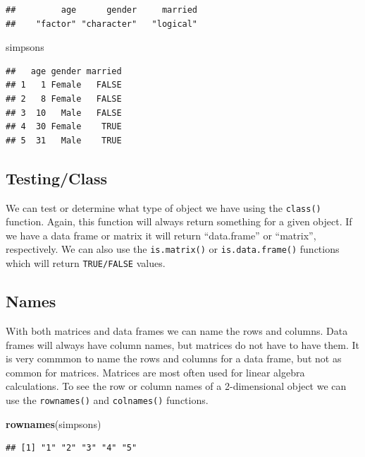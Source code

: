 \documentclass[
]{book}
\newenvironment{Shaded}{\begin{snugshade}}{\end{snugshade}}
\newcommand{\KeywordTok}[1]{\textcolor[rgb]{0.13,0.29,0.53}{\textbf{#1}}}
\newcommand{\NormalTok}[1]{#1}
\begin{document}
\begin{verbatim}
##         age      gender     married 
##    "factor" "character"   "logical"
\end{verbatim}

\begin{Shaded}
\begin{Highlighting}[]
\NormalTok{simpsons}
\end{Highlighting}
\end{Shaded}

\begin{verbatim}
##   age gender married
## 1   1 Female   FALSE
## 2   8 Female   FALSE
## 3  10   Male   FALSE
## 4  30 Female    TRUE
## 5  31   Male    TRUE
\end{verbatim}

\hypertarget{testingclass-2}{%
\subsection{Testing/Class}\label{testingclass-2}}

We can test or determine what type of object we have using the \texttt{class()} function. Again, this function will always return something for a given object. If we have a data frame or matrix it will return ``data.frame'' or ``matrix'', respectively. We can also use the \texttt{is.matrix()} or \texttt{is.data.frame()} functions which will return \texttt{TRUE/FALSE} values.

\hypertarget{names-3}{%
\subsection{Names}\label{names-3}}

With both matrices and data frames we can name the rows and columns. Data frames will always have column names, but matrices do not have to have them. It is very commmon to name the rows and columns for a data frame, but not as common for matrices. Matrices are most often used for linear algebra calculations. To see the row or column names of a 2-dimensional object we can use the \texttt{rownames()} and \texttt{colnames()} functions.

\begin{Shaded}
\begin{Highlighting}[]
\KeywordTok{rownames}\NormalTok{(simpsons)}
\end{Highlighting}
\end{Shaded}

\begin{verbatim}
## [1] "1" "2" "3" "4" "5"
\end{verbatim}
\end{document}

